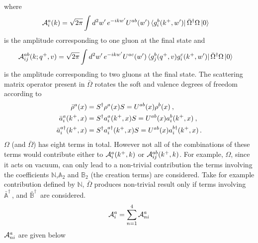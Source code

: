 \documentclass[aps,prd,amsmath,amssymb,nofootinbib]{revtex4-2}
\def\mf#1{\mathbb{#1}}
\numberwithin{equation}{section}
\begin{document}
where \begin{align}
    {\cal A}^{a}_{i}(k) & = \sqrt{2\pi} \int d^{2}w^\prime\,e^{-ikw^\prime} U^{ab}(w^\prime)\bra{g^{b}_{i}(k^{+},w^\prime)}\Bar{\Omega}^{\dagger}\Omega\ket{0}
\end{align}
is the amplitude corresponding to one gluon at the final state and 
\begin{align}
     {\cal A}^{ab}_{ij}(k; q^+, v) & = \sqrt{2\pi} \int d^{2} w^{\prime}\,  e^{-ikw^\prime} U^{ac}(w^\prime)\bra{g^{b}_{j}(q^{+},v)g^{c}_{i}(k^{+},w^\prime)}\Bar{\Omega}^{\dagger}\Omega\ket{0}
\end{align}
 is the amplitude corresponding to two gluons at the final state. 
The scattering matrix operator present in $\bar \Omega$ rotates the soft and valence degrees of freedom according to  
\begin{align}
    \bar \rho^a(x)  &= S^\dagger  \rho^a(x) S 
    = U^{a b}(x)  \rho^b(x) \:, \notag  \\ 
    \bar a_i^a(k^+, x)  &= S^\dagger a_i^{a}(k^+,x) S 
    = U^{a b}(x)  a_i^b(k^+,x) \:, \notag  \\
    \bar a_i^{a\dagger}(k^+,x)  &= S^\dagger a_i^{a\dagger}(k^+,x) S 
    = U^{a b}(x)  a_i^{b\dagger}(k^+, x) \,. 
\end{align}
$\Omega$ (and $\bar \Omega$) has eight terms in total. 
However not all of the combinations of these terms would contribute either to  $  {\cal A}_i^a (k^+, k) $ or ${\cal A}^{ab}_{ij}(k^{+},k)$.  For example, $\Omega$, since it acts on vacuum, can only lead to a non-trivial contribution the terms involving the coefficients $\mf{N}$,$\mf{A}_2$ and $\mf{B}_2$ (the creation terms) are considered.  
Take for example contribution defined by $\mf{N}$, $\bar \Omega$ produces non-trivial result only if terms involving $\bar {\mf{A}}^\dagger\,$, and $\bar {\mf{B}}^\dagger\,$ are considered. 
\begin{align}
    {\cal A}^{a}_i = \sum_{n=1}^4 {\cal A}^{a}_{n i} 
\end{align}
${\cal A}^{a}_{n i}$ are given below  
\end{document}

